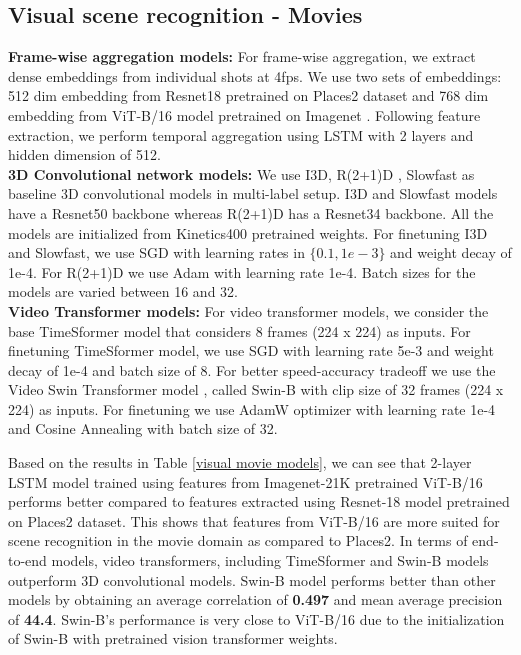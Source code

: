 \subsection{Visual scene recognition - Movies}
\textbf{Frame-wise aggregation models:} For frame-wise aggregation, we extract dense embeddings from individual shots at 4fps. We use two sets of embeddings: 512 dim embedding from Resnet18 \cite{He2015} pretrained on Places2 dataset and 768 dim embedding from ViT-B/16 \cite{dosovitskiy2020vit} model pretrained on Imagenet \cite{Deng2009ImageNetAL}.
Following feature extraction, we perform temporal aggregation using LSTM \cite{lstm} with 2 layers and hidden dimension of 512.
\\
\textbf{3D Convolutional network models:} 
We use I3D\cite{i3d}, R(2+1)D \cite{r2plus1d}, Slowfast \cite{feichtenhofer2019slowfast} as baseline 3D convolutional models in multi-label setup. I3D\cite{i3d} and Slowfast\cite{feichtenhofer2019slowfast} models have a Resnet50\cite{He2015} backbone whereas R(2+1)D \cite{r2plus1d} has a Resnet34\cite{He2015} backbone. All the models are initialized from Kinetics400 \cite{kinetics400} pretrained weights. For finetuning I3D\cite{i3d} and Slowfast\cite{feichtenhofer2019slowfast}, we use SGD with learning rates in $\{0.1,1e-3\}$ and weight decay of 1e-4. For R(2+1)D \cite{r2plus1d} we use Adam \cite{Kingma2015AdamAM} with learning rate 1e-4. Batch sizes for the models are varied between 16 and 32. \\
\textbf{Video Transformer models:}
For video transformer models, we consider the base TimeSformer model \cite{Bertasius2021IsSA} that considers 8 frames (224 x 224) as inputs. For finetuning TimeSformer \cite{Bertasius2021IsSA} model, we use SGD with learning rate 5e-3 and weight decay of 1e-4 and batch size of 8. For better speed-accuracy tradeoff we use the Video Swin Transformer model \cite{liu2021video}, \cite{liu2021Swin} called Swin-B with clip size of 32 frames (224 x 224) as inputs. For finetuning we use AdamW \cite{AdamW} optimizer with learning rate 1e-4 and Cosine Annealing with batch size of 32. 
\par 
Based on the results in Table \ref{visual movie models}, we can see that 2-layer LSTM model trained using features from Imagenet-21K pretrained ViT-B/16 performs better compared to features extracted using Resnet-18 model pretrained on Places2 dataset. This shows that features from ViT-B/16 are more suited for scene recognition in the movie domain as compared to Places2.
In terms of end-to-end models, video transformers, including TimeSformer and Swin-B models outperform 3D convolutional models. Swin-B model performs better than other models by obtaining an average correlation of \textbf{0.497} and mean average precision of \textbf{44.4}. Swin-B's performance is very close to ViT-B/16 due to the initialization of Swin-B with pretrained vision transformer weights. 
